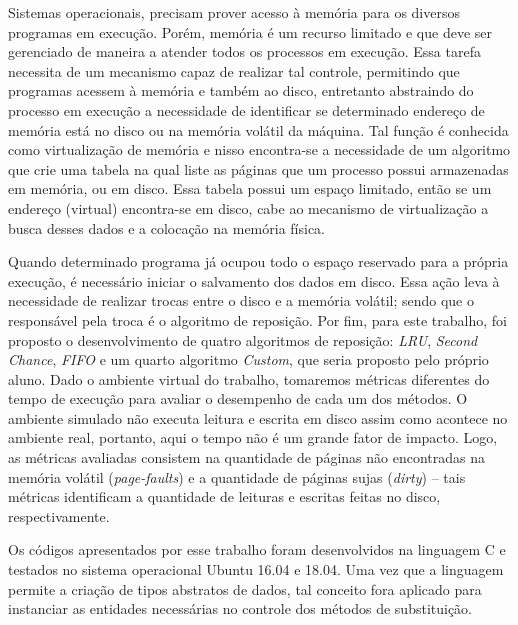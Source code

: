 Sistemas operacionais, precisam prover acesso à memória para os diversos
programas em execução.
Porém, memória é um recurso limitado e que deve ser gerenciado de maneira a
atender todos os processos em execução.
Essa tarefa necessita de um mecanismo capaz de realizar tal controle,
permitindo que programas acessem à memória e também ao disco, entretanto
abstraindo do processo em execução a necessidade de identificar se determinado
endereço de memória está no disco ou na memória volátil da máquina.
Tal função é conhecida como virtualização de memória e nisso encontra-se a
necessidade de um algoritmo que crie uma tabela na qual liste as páginas que um
processo possui armazenadas em memória, ou em disco.
Essa tabela possui um espaço limitado, então se um endereço (virtual)
encontra-se em disco, cabe ao mecanismo de virtualização a busca desses dados e
a colocação na memória física.

Quando determinado programa já ocupou todo o espaço reservado para a própria
execução, é necessário iniciar o salvamento dos dados em disco.
Essa ação leva à necessidade de realizar trocas entre o disco e a memória
volátil; sendo que o responsável pela troca é o algoritmo de reposição.
Por fim, para este trabalho, foi proposto o desenvolvimento de quatro
algoritmos de reposição: \textit{LRU}, \textit{Second Chance}, \textit{FIFO}
e um quarto algoritmo \textit{Custom}, que seria proposto pelo próprio aluno.
Dado o ambiente virtual do trabalho, tomaremos métricas diferentes do tempo de
execução para avaliar o desempenho de cada um dos métodos.
O ambiente simulado não executa leitura e escrita em disco assim como acontece
no ambiente real, portanto, aqui o tempo não é um grande fator de impacto.
Logo, as métricas avaliadas consistem na quantidade de páginas não encontradas
na memória volátil (\textit{page-faults}) e a quantidade de páginas sujas 
(\textit{dirty}) -- tais métricas identificam a quantidade de leituras e
escritas feitas no disco, respectivamente.

Os códigos apresentados por esse trabalho foram desenvolvidos na linguagem C e
testados no sistema operacional Ubuntu 16.04 e 18.04.
Uma vez que a linguagem permite a criação de tipos abstratos de dados, tal
conceito fora aplicado para instanciar as entidades necessárias no controle dos
métodos de substituição.